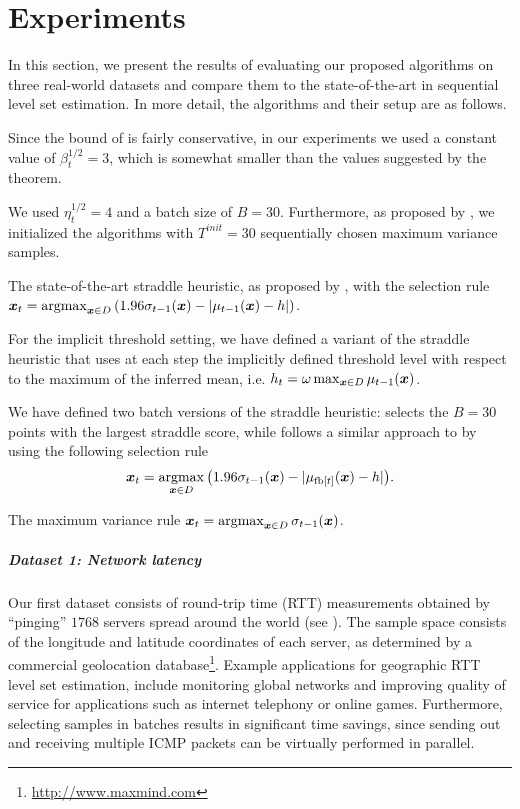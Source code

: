 \chapter{Experiments} \label{sect:exp} 
In this section, we present the results of evaluating our proposed algorithms on
three real-world datasets and compare them to the state-of-the-art in sequential
level set estimation.
In more detail, the algorithms and their setup are as follows.
\begin{description}[labelindent=0pt,leftmargin=7pt,itemindent=-2pt,itemsep=0pt]
\item[\acl/\iacl:] Since the bound of  is fairly conservative,
  in our experiments we used a constant value of $\beta_t^{1/2} = 3$, which is
  somewhat smaller than the values suggested by the theorem.
\item[\bacl/\ibacl:] We used $\eta_t^{1/2} = 4$ and a batch size of $B = 30$.
  Furthermore, as proposed by \citet{desautels12}, we initialized the
  algorithms with $T^{init} = 30$ sequentially chosen maximum variance samples.
\item[\str:] The state-of-the-art straddle heuristic,
  as proposed by \citet{bryan05}, with the selection rule
  ${\*x_t = \argmax_{\*x \in D} \left(1.96\sigma_{t-1}(\*x) - |\mu_{t-1}(\*x) - h|\right)}$.
\item[\istr:] For the implicit threshold setting, we have defined a
  variant of the straddle heuristic that uses at each step the
  implicitly defined threshold level with respect to the maximum of the
  inferred mean, i.e.
  ${h_t = \omega \max_{\bm{x}\in D} \mu_{t-1}(\bm{x})}$.
\item[\rstr/\bstr:] We have defined two batch versions of the straddle heuristic:
  \rstr selects the $B = 30$ points with
  the largest straddle score, while \bstr follows a similar approach to \bacl
  by using the following selection rule
  \begin{align*}
  {\*x_t = \argmax_{\*x \in D}\left(1.96\sigma_{t-1}(\*x) - |\mu_{\fb[t]}(\*x) - h|\right)}.
  \end{align*}
\item[\var:]  The maximum variance rule
  $\*x_t = \argmax_{\*x \in D} \sigma_{t-1}(\*x)$.
\end{description}

\paragraph{Dataset 1: Network latency}
Our first dataset consists of round-trip time (RTT) measurements obtained
by ``pinging'' $1768$ servers spread around the world (see ).
The sample space consists of the longitude and latitude coordinates of each
server, as determined by a commercial geolocation
database\footnote{\url{http://www.maxmind.com}}.
Example applications for geographic RTT level set estimation, include
monitoring global networks and improving quality of service for applications
such as internet telephony or online games. Furthermore,
selecting samples in batches results in significant time savings, since
sending out and receiving multiple ICMP packets can be virtually performed in
parallel.

